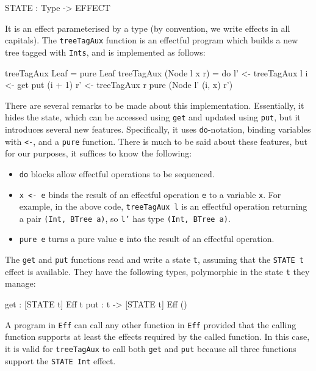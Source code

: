 \begin{code}
STATE : Type -> EFFECT
\end{code}

\noindent
It is an effect parameterised by a type (by convention, we write
effects in all capitals).
The \texttt{treeTagAux} function is an effectful program
which builds a new tree tagged with \texttt{Ints}, and is implemented as
follows:

\begin{code}
treeTagAux Leaf = pure Leaf
treeTagAux (Node l x r)
    = do l' <- treeTagAux l
         i <- get
         put (i + 1)
         r' <- treeTagAux r
         pure (Node l' (i, x) r')
\end{code}

\noindent
There are several remarks to be made about this implementation. Essentially,
it hides the state, which can be accessed using \texttt{get} and updated using
\texttt{put}, but it introduces several new features. Specifically, it uses
\texttt{do}-notation, binding variables with \texttt{<-}, and a
\texttt{pure} function. There is much to be said about these features, but
for our purposes, it suffices to know the following:

\begin{itemize}
\item \texttt{do} blocks allow effectful operations to be sequenced.
\item \texttt{x <- e} binds the result of an effectful operation \texttt{e} to
a variable \texttt{x}. For example, in the above code, \texttt{treeTagAux l}
is an effectful operation returning a pair \texttt{(Int, BTree a)}, so
\texttt{l'} has type \texttt{(Int, BTree a)}.
\item \texttt{pure e} turns a pure value \texttt{e} into the result of
an effectful operation. 
\end{itemize}

\noindent
The \texttt{get} and \texttt{put} functions read and write a state \texttt{t}, 
assuming that the \texttt{STATE t} effect is available. They have the following
types, polymorphic in the state \texttt{t} they manage:

\begin{code}
get :      { [STATE t] } Eff t
put : t -> { [STATE t] } Eff () 
\end{code}

\noindent
A program in \texttt{Eff} can call any other function in \texttt{Eff} provided
that the calling function supports at least the effects required by the called
function. In this case, it is valid for \texttt{treeTagAux} to call both
\texttt{get} and \texttt{put} because all three functions support the
\texttt{STATE Int} effect.

